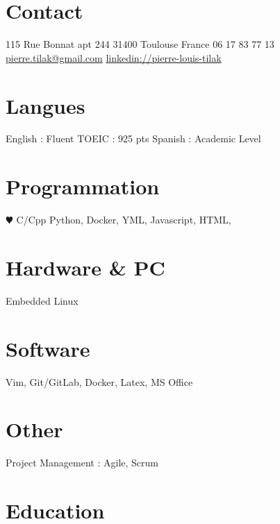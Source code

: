 \documentclass[a4paper]{friggeri-cv} %
\begin{document}


\begin{aside} %
\section{Contact}
115 Rue Bonnat apt 244
31400 Toulouse
France
06 17 83 77 13
~
\href{mailto:pierre.tilak@gmail.com}{pierre.tilak@gmail.com}
\href{https://www.linkedin.com/pub/pierre-louis-tilak/96/162/a83}{linkedin://pierre-louis-tilak}
\section{Langues}
English : Fluent
TOEIC : 925 pts 
Spanish : Academic Level\bigskip\bigskip
\section{Programmation}
{\color{red} $\varheartsuit$} C/Cpp
Python, Docker, YML,
Javascript,
HTML,\bigskip\bigskip
\section{Hardware \& PC}
Embedded Linux\bigskip\bigskip
\section{Software}
Vim, Git/GitLab, Docker, Latex, MS Office\bigskip\bigskip
\section{Other}
Project Management : Agile, Scrum	
\end{aside}


\section{Education}
\end{document}
